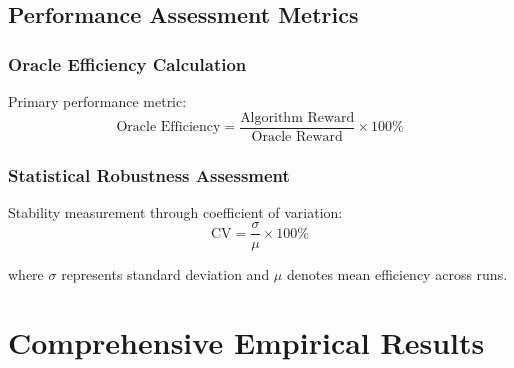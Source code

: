 \documentclass[12pt,a4paper]{article}
\begin{document}
\subsection{Performance Assessment Metrics}

\subsubsection{Oracle Efficiency Calculation}
Primary performance metric:
\begin{equation}
\text{Oracle Efficiency} = \frac{\text{Algorithm Reward}}{\text{Oracle Reward}} \times 100\%
\end{equation}

\subsubsection{Statistical Robustness Assessment}
Stability measurement through coefficient of variation:
\begin{equation}
\text{CV} = \frac{\sigma}{\mu} \times 100\%
\end{equation}

where $\sigma$ represents standard deviation and $\mu$ denotes mean efficiency across runs.

\section{Comprehensive Empirical Results}
\end{document}
